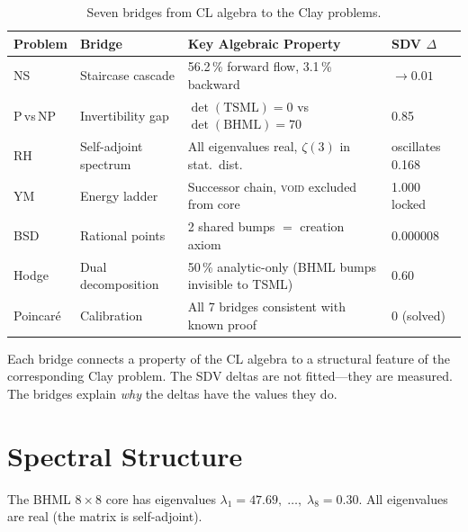 \documentclass[12pt, openany]{book}
\theoremstyle{remark}
\begin{document}
\begin{table}[ht]
\centering
\caption{Seven bridges from CL algebra to the Clay problems.}
\label{tab:bridges}
\begin{tabular}{@{}llll@{}}
\toprule
\textbf{Problem} & \textbf{Bridge} & \textbf{Key Algebraic Property} & \textbf{SDV $\Delta$} \\
\midrule
NS       & Staircase cascade   & 56.2\,\% forward flow, 3.1\,\% backward      & $\to 0.01$            \\
P\,vs\,NP & Invertibility gap   & $\det(\mathrm{TSML})=0$ vs $\det(\mathrm{BHML})=70$ & 0.85          \\
RH       & Self-adjoint spectrum & All eigenvalues real, $\zeta(3)$ in stat.\ dist.  & oscillates 0.168 \\
YM       & Energy ladder       & Successor chain, \textsc{void} excluded from core & 1.000 locked     \\
BSD      & Rational points     & 2 shared bumps $=$ creation axiom               & 0.000008          \\
Hodge    & Dual decomposition  & 50\,\% analytic-only (BHML bumps invisible to TSML) & 0.60          \\
Poincar\'e & Calibration       & All 7 bridges consistent with known proof       & 0 (solved)         \\
\bottomrule
\end{tabular}
\end{table}

Each bridge connects a property of the CL algebra to a structural feature of
the corresponding Clay problem.  The SDV deltas are not fitted---they are
measured.  The bridges explain \emph{why} the deltas have the values they do.

\section{Spectral Structure}
\label{sec:spectral}

The BHML $8\times 8$ core has eigenvalues
$\lambda_1 = 47.69,\; \ldots,\; \lambda_8 = 0.30$.
All eigenvalues are real (the matrix is self-adjoint).
\end{document}
